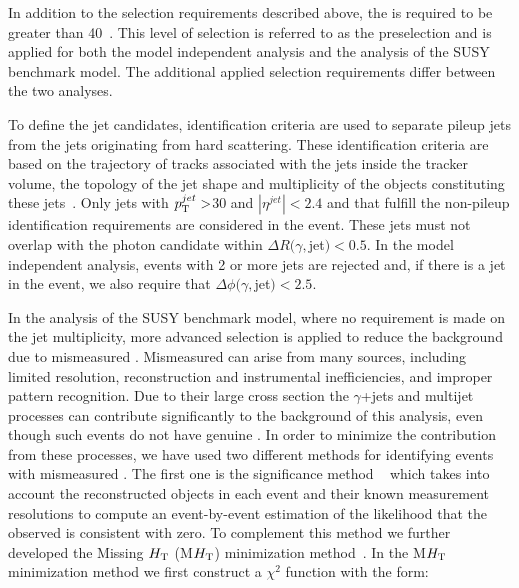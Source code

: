         In addition to the selection requirements described above, the \met is required to be greater than 40~\GeV. This level of selection is referred to as the preselection and is applied for both the model independent analysis and the analysis of the SUSY benchmark model. The additional applied selection requirements differ between the two analyses.
  
        To define the jet candidates, identification criteria are used to separate pileup jets from the jets originating from hard scattering. These identification criteria are based on the trajectory of tracks associated with the jets inside the tracker volume, the topology of the jet shape and multiplicity of the objects constituting these jets~\cite{CMS-PAS-JME-13-005}. Only jets with $p_{\mathrm{T}}^{jet} > $30 \GeV and $|\eta^{jet}| < 2.4$ and that fulfill the non-pileup identification requirements are considered in the event. These jets must not overlap with the photon candidate within $\Delta R(\gamma,$jet$) < 0.5$. In the model independent analysis, events with 2 or more jets are rejected and, if there is a jet in the event, we also require that $\Delta \phi(\gamma,$jet$) < 2.5$. 

	    In the analysis of the SUSY benchmark model, where no requirement is made on the jet multiplicity, more advanced selection is applied to reduce the background due to mismeasured \met. Mismeasured \met can arise from many sources, including limited \met resolution, reconstruction and instrumental inefficiencies, and improper pattern recognition. Due to their large cross section the $\gamma$+jets and multijet processes can contribute significantly to the background of this analysis, even though such events do not have genuine \met. In order to minimize the contribution from these processes, we have used two different methods for identifying events with mismeasured \met. The first one is  the \met significance method ~\cite{Chatrchyan:2011tn} which takes into account the reconstructed objects in each event and their known measurement resolutions to compute an event-by-event estimation of the likelihood that the observed \met is consistent with zero. To complement this method we further developed the Missing $H_{\mathrm{T}}$ (M$H_{\mathrm{T}}$) minimization method~\cite{CMS:2014mea}. In the M$H_{\mathrm{T}}$ minimization method we first construct a $\chi^2$ function with the form:
 
